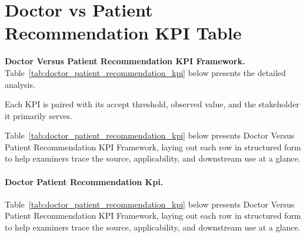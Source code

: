 \section*{Doctor vs Patient Recommendation KPI Table}
\label{sec:app_ch5_tab_doctor_patient_recommendation_kpi}


\noindent\textbf{Doctor Versus Patient Recommendation KPI Framework.} Table~\ref{tab:doctor_patient_recommendation_kpi} below presents the detailed analysis.

\clearpage
\noindent Each KPI is paired with its accept threshold, observed value, and the stakeholder it primarily serves.
{\tablestripes\tablefontsize


\noindent Table~\ref{tab:doctor_patient_recommendation_kpi} below presents Doctor Versus Patient Recommendation KPI Framework, laying out each row in structured form to help examiners trace the source, applicability, and downstream use at a glance. %
\paragraph{Doctor Patient Recommendation Kpi.} %
\noindent Table~\ref{tab:doctor_patient_recommendation_kpi} below presents Doctor Versus Patient Recommendation KPI Framework, laying out each row in structured form to help examiners trace the source, applicability, and downstream use at a glance. %



}
